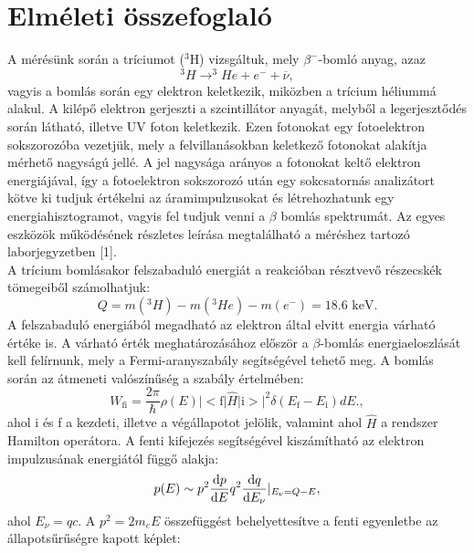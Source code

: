 \documentclass[12pt,a4paper]{article}
\begin{document}
\section{Elméleti összefoglaló}
\hspace*{10pt} A mérésünk során a tríciumot ($^3$H) vizsgáltuk, mely $\beta ^-$-bomló anyag, azaz
\begin{equation}
^3H\rightarrow ^3 He + e ^- +\overline{\nu}, 
\end{equation}
vagyis a bomlás során egy elektron keletkezik, miközben a trícium héliummá alakul. A kilépő elektron gerjeszti a szcintillátor anyagát, melyből a legerjesztődés során látható, illetve UV foton keletkezik. Ezen fotonokat egy fotoelektron sokszorozóba vezetjük, mely a felvillanásokban keletkező fotonokat alakítja mérhető nagyságú jellé. A jel nagysága arányos a fotonokat keltő elektron energiájával, így a fotoelektron sokszorozó után egy sokcsatornás analizátort kötve ki tudjuk értékelni az áramimpulzusokat és létrehozhatunk egy energiahisztogramot, vagyis fel tudjuk venni a $\beta$ bomlás spektrumát. Az egyes eszközök működésének részletes leírása megtalálható a méréshez tartozó laborjegyzetben [1].\\
\hspace*{10pt} A  trícium bomlásakor felszabaduló energiát a reakcióban résztvevő részecskék tömegeiből számolhatjuk:
\begin{equation}
Q=m(^3H)-m(^3He)-m(e^-) = 18.6 \textrm{ keV}.
\end{equation}
 A felszabaduló energiából megadható az elektron által elvitt energia várható értéke is. A várható érték meghatározásához először a $\beta$-bomlás energiaeloszlását kell felírnunk, mely a Fermi-aranyszabály segítségével tehető meg. A bomlás során az átmeneti valószínűség a szabály értelmében:
\begin{equation}
W_{\textrm{fi}}=\frac{2\pi}{\hbar}\rho (E) |<\textrm{f}|\hat{H}|\textrm{i}>|^2 \delta (E_{\textrm{f}}-E_{\textrm{i}})dE.,
\end{equation}
ahol i és f a kezdeti, illetve a végállapotot jelölik, valamint ahol $\hat{H}$ a rendszer Hamilton operátora. A fenti kifejezés segítségével kiszámítható az elektron impulzusának energiától függő alakja:
\begin{equation}
p(E) \sim p^2 \frac{\textrm{d}p}{\textrm{d}E}q^2 \frac{\textrm{d}q}{\textrm{d}E_{\nu}} \arrowvert _{E_{\nu}=Q-E},
\end{equation}
ahol $E_{\nu}=qc$. A $p^2=2m_e E$ összefüggést behelyettesítve a fenti egyenletbe az állapotsűrűségre kapott képlet:
\end{document}
